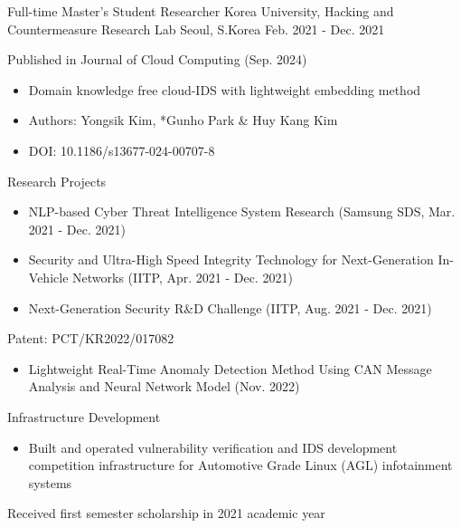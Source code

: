 \begin{cventries}
\cventry
    {Full-time Master's Student Researcher} %
    {Korea University, Hacking and Countermeasure Research Lab} %
    {Seoul, S.Korea} %
    {Feb. 2021 - Dec. 2021} %
    {
      \begin{cvitems}
        \item {Published in Journal of Cloud Computing (Sep. 2024)}
        \begin{itemize}
          \item {Domain knowledge free cloud-IDS with lightweight embedding method}
          \item {Authors: Yongsik Kim, *Gunho Park \& Huy Kang Kim}
          \item {DOI: 10.1186/s13677-024-00707-8}
        \end{itemize}
        \item {Research Projects}
        \begin{itemize}
          \item {NLP-based Cyber Threat Intelligence System Research (Samsung SDS, Mar. 2021 - Dec. 2021)}
          \item {Security and Ultra-High Speed Integrity Technology for Next-Generation In-Vehicle Networks (IITP, Apr. 2021 - Dec. 2021)}
          \item {Next-Generation Security R\&D Challenge (IITP, Aug. 2021 - Dec. 2021)}
        \end{itemize}
        \item {Patent: PCT/KR2022/017082}
        \begin{itemize}
          \item {Lightweight Real-Time Anomaly Detection Method Using CAN Message Analysis and Neural Network Model (Nov. 2022)}
        \end{itemize}
        \item {Infrastructure Development}
        \begin{itemize}
          \item {Built and operated vulnerability verification and IDS development competition infrastructure for Automotive Grade Linux (AGL) infotainment systems}
        \end{itemize}
        \item {Received first semester scholarship in 2021 academic year}
      \end{cvitems}
    }


\end{cventries}
